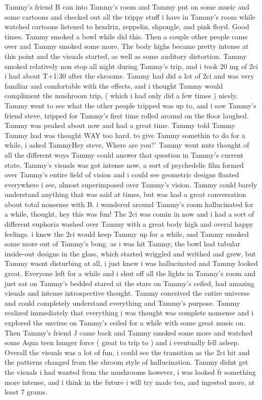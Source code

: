 \documentclass[12pt]{book}
\begin{document}
Tammy's friend B can into Tammy's room and Tammy put on some music and some cartoons and checked out all the trippy stuff i have in Tammy's room while watched cartoons listened to hendrix, zeppelin, shpongle, and pink floyd. Good times. Tammy smoked a bowl while did this. Then a couple other people came over and Tammy smoked some more. The body highs became pretty intense at this point and the visuals started, as well as some auditory distortion. Tammy smoked relatively non stop all night during Tammy's trip, and i took 20 mg of 2ci i had about T+1:30 after the shrooms. Tammy had did a lot of 2ci and was very familiar and comfortable with the effects, and i thought Tammy would compliment the mushroom trip, ( which i had only did a few times ) nicely. Tammy went to see what the other people tripped was up to, and i saw Tammy's friend steve, tripped for Tammy's first time rolled around on the floor laughed. Tammy was peaked about now and had a great time. Tammy told Tammy Tammy had was thought WAY too hard. to give Tammy somethin to do for a while, i asked TammyHey steve, Where are you?' Tammy went nuts thought of all the different ways Tammy could answer that question in Tammy's current state. Tammy's visuals was got intense now, a sort of psychedelic film formed over Tammy's entire field of vision and i could see geometric designs floated everywhere i see, almost superimposed over Tammy's vision. Tammy could barely understand anything that was said at times, but was had a great conversation about total nonsense with B. i wandered around Tammy's room hallucinated for a while, thought, hey this was fun! The 2ci was comin in now and i had a sort of different euphoria washed over Tammy with a great body high and overal happy feelings. i knew the 2ci would keep Tammy up for a while, and Tammy smoked some more out of Tammy's bong. as i was hit Tammy, the bowl had tubular inside-out designs in the glass, which started wriggled and writhed and grew, but Tammy wasnt disturbing at all, i just knew i was hallucinated and Tammy looked great. Everyone left for a while and i shut off all the lights in Tammy's room and just sat on Tammy's bedded stared at the stars on Tammy's ceiled, had amazing visuals and intense introspective thought. Tammy conceived the entire universe and could completely understand everything and Tammy's purpose. Tammy realized immediately that everything i was thought was complete nonsense and i explored the unvirse on Tammy's ceiled for a while with some great music on. Then Tammy's friend J came back and Tammy smoked some more and watched some Aqua teen hunger force ( great to trip to ) and i eventually fell asleep. Overall the visuals was a lot of fun, i could see the transition as the 2ci hit and the patterns changed from the shroom style of hallucination. Tammy didnt get the visuals i had wanted from the mushrooms however, i was looked fr something more intense, and i think in the future i will try made tea, and ingested more, at least 7 grams.
\end{document}
